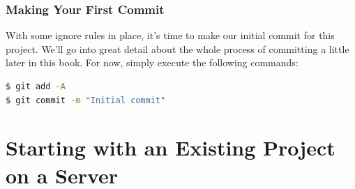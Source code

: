 \documentclass{article}
\begin{document}
\subsubsection{Making Your First Commit}
With some ignore rules in place, it's time to make our initial commit for this project. We'll go into great detail about the whole process of committing a little later in this book. For now, simply execute the following commands:

\begin{lstlisting}[language=bash]
$ git add -A
$ git commit -m "Initial commit"
\end{lstlisting}

\section{Starting with an Existing Project on a Server}
\end{document}

